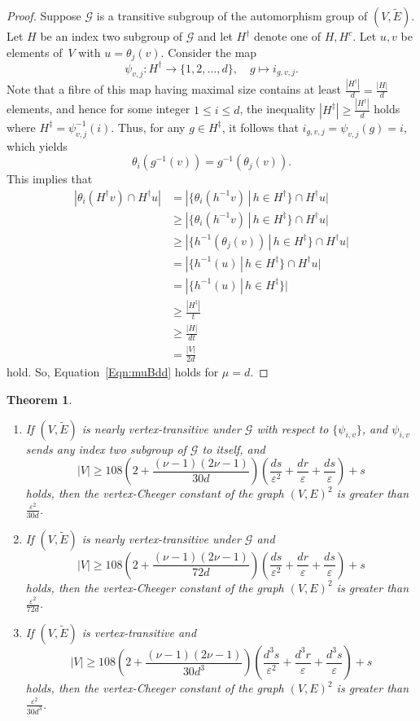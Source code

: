 \documentclass[10pt]{article}
\newtheorem{theorem}{Theorem}[section]
\theoremstyle{definition}
\newcommand{\mo}{{-1}}
\newcommand{\calG}{\ensuremath{\mathcal{G}}}
\begin{document}
\begin{proof}
Suppose $\calG$ is a transitive subgroup of the automorphism group of $(V, \widetilde E)$. Let $H$ be an index two subgroup of $\calG$ and let $H^\dag$ denote one of $H, H^c$. Let $u,v$ be elements of~$V$ with $u = \theta_j(v)$. Consider the map 
$$\psi_{v, j} : H^\dag \to \{1, 2, \ldots, d\},\quad
g \mapsto i_{g, v, j}.$$
Note that a fibre of this map having maximal size contains at least $\frac {|H^\dag|}d = \frac{|H|}d$ elements, and hence for some integer $1\leq i \leq d$, the inequality $|H^\ddag  |\geq \frac {|H^\dag|}d$ holds where $H^\ddag = \psi_{v, j}^\mo(i)$. Thus, for any $g\in H^\ddag$, it follows that $i_{g, v, j} = \psi_{v, j}(g) = i$, which yields 
\[\theta_i(g^\mo(v)) = g^\mo (\theta_j (v)) .\]
This implies that 
\begin{align*}
|\theta_{i} (H^\dag v) \cap H^\dag u|
& = |\{\theta_{i}(h^\mo v) \,|\, h\in H^\dag\}\cap H^\dag u|\\
& \geq |\{\theta_{i}(h^\mo v) \,|\, h\in H^\ddag\}\cap H^\dag u|\\
& \geq |\{h^\mo (\theta_j(v)) \,|\, h\in H^\ddag\}\cap H^\dag u|\\
& = |\{h^\mo (u) \,|\, h\in H^\ddag\}\cap H^\dag u|\\
& = |\{h^\mo (u) \,|\, h\in H^\ddag\}|\\
& \geq \frac{|H^\ddag|}{t} \\
& \geq \frac{|H|}{dt}\\
& = \frac{|V|}{2d}
\end{align*}
hold. So, Equation~\eqref{Eqn:muBdd} holds for $\mu = d$. 
\end{proof}

\begin{theorem}\label{Thm:SpannSubgraVertexTra}
\quad
\begin{enumerate}
\item 
If $(V, \widetilde E)$ is nearly vertex-transitive under $\calG$ with respect to $\{\psi_{i,v}\}$, and $\psi_{i, v}$ sends any index two subgroup of $\calG$ to itself, and 
$$
|V| 
 \geq 
108
\left( 2 + \frac {(\nu-1)(2\nu -1)} {30d}  \right)  
\left( \frac{ds}{\varepsilon^2} + \frac{dr}\varepsilon +\frac{ds}{\varepsilon}\right) + s 
$$
holds, 
then the vertex-Cheeger constant of the graph $(V, E)^2$ is greater than~$\frac{\varepsilon^{2}}{30d}$. 

\item 
If $(V, \widetilde E)$ is nearly vertex-transitive under $\calG$ and 
$$
|V| 
 \geq 
108
\left( 2 + \frac {(\nu-1)(2\nu -1)}  {72d} \right)  
\left( \frac{ds}{\varepsilon^2} + \frac{dr}\varepsilon +\frac{ds}{\varepsilon}\right) + s 
$$
holds, then the vertex-Cheeger constant of the graph $(V, E)^2$ is greater than~$\frac{\varepsilon^{2}}{72d}$. 
\item 
If $(V, \widetilde E)$ is vertex-transitive and 
$$
|V| 
 \geq 
108
\left( 2 + \frac {(\nu-1)(2\nu -1)}  {30d^3} \right)  
\left( \frac{d^3s}{\varepsilon^2} + \frac{d^3r}\varepsilon+ \frac{d^{3}s}{\varepsilon}\right) + s
$$
holds, then the vertex-Cheeger constant of the graph $(V, E)^2$ is greater than~$ \frac{\varepsilon^{2}}{30d^3}$. 
\end{enumerate}
\end{theorem}
\end{document}
